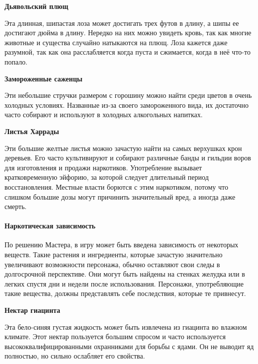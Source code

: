 \documentclass[a4paper, 9pt, twocolumn]{book}
\begin{document}
	\medspace
	
	\noindent \textbf{Дьявольский плющ}
	
	\smallskip
	
	\noindent Эта длинная, шипастая лоза может достигать трех футов в длину, а шипы ее достигают дюйма в длину. Нередко на них можно увидеть кровь, так как многие животные и существа случайно натыкаются на плющ. Лоза кажется даже разумной, так как она расслабляется когда пуста и сжимается, когда в неё что-то попало.
	
	\medspace
	
	\noindent \textbf{Замороженные саженцы}
	
	\smallskip
	
	\noindent Эти небольшие стручки размером с горошину можно найти среди цветов в очень холодных условиях. Названные из-за своего замороженного вида, их достаточно часто собирают и используют в холодных алкогольных напитках.
	
	\medspace
	
	\noindent \textbf{Листья Харрады}
	
	\smallskip
	
	\noindent Эти большие желтые листья можно зачастую найти на самых верхушках крон деревьев.  Его часто культивируют и собирают различные банды и гильдии воров для изготовления и продажи наркотиков. Употребление вызывает кратковременную эйфорию, за которой следует длительный период восстановления. Местные власти борются с этим наркотиком, потому что слишком большие дозы могут причинить значительный вред, а иногда даже смерть.
	
	\paragraph*{Наркотическая зависимость}
	
	\noindent По решению Мастера, в игру может быть введена зависимость от некоторых веществ. Такие растения и ингредиенты, которые зачастую значительно увеличивают возможности персонажа, обычно оставляют свои следы в долгосрочной перспективе. Они могут быть найдены на стенках желудка или в легких спустя дни и недели после использования. Персонажи, употребляющие такие вещества, должны представлять себе последствия, которые те привнесут.
	
	\medspace
	
	\noindent \textbf{Нектар гиацинта}
	
	\noindent Эта бело-синяя густая жидкость может быть извлечена из гиацинта во влажном климате. Этот нектар пользуется большим спросом и часто используется высококвалифицированными охранниками для борьбы с ядами. Он не выводит яд полностью, но сильно ослабляет его свойства.
	
\end{document}
